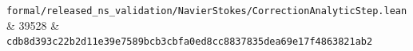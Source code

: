 \documentclass[10pt,a4paper]{article}
\begin{document}
{\begin{longtable}[]
\texttt{f\allowbreak{}o\allowbreak{}r\allowbreak{}m\allowbreak{}a\allowbreak{}l\allowbreak{}/\allowbreak{}r\allowbreak{}e\allowbreak{}l\allowbreak{}e\allowbreak{}a\allowbreak{}s\allowbreak{}e\allowbreak{}d\allowbreak{}\_\allowbreak{}n\allowbreak{}s\allowbreak{}\_\allowbreak{}v\allowbreak{}a\allowbreak{}l\allowbreak{}i\allowbreak{}d\allowbreak{}a\allowbreak{}t\allowbreak{}i\allowbreak{}o\allowbreak{}n\allowbreak{}/\allowbreak{}N\allowbreak{}a\allowbreak{}v\allowbreak{}i\allowbreak{}e\allowbreak{}r\allowbreak{}S\allowbreak{}t\allowbreak{}o\allowbreak{}k\allowbreak{}e\allowbreak{}s\allowbreak{}/\allowbreak{}C\allowbreak{}o\allowbreak{}r\allowbreak{}r\allowbreak{}e\allowbreak{}c\allowbreak{}t\allowbreak{}i\allowbreak{}o\allowbreak{}n\allowbreak{}A\allowbreak{}n\allowbreak{}a\allowbreak{}l\allowbreak{}y\allowbreak{}t\allowbreak{}i\allowbreak{}c\allowbreak{}S\allowbreak{}t\allowbreak{}e\allowbreak{}p\allowbreak{}.\allowbreak{}l\allowbreak{}e\allowbreak{}a\allowbreak{}n} & {}39528 & \texttt{c\allowbreak{}d\allowbreak{}b\allowbreak{}8\allowbreak{}d\allowbreak{}3\allowbreak{}9\allowbreak{}3\allowbreak{}c\allowbreak{}2\allowbreak{}2\allowbreak{}b\allowbreak{}2\allowbreak{}d\allowbreak{}1\allowbreak{}1\allowbreak{}e\allowbreak{}3\allowbreak{}9\allowbreak{}e\allowbreak{}7\allowbreak{}5\allowbreak{}8\allowbreak{}9\allowbreak{}b\allowbreak{}c\allowbreak{}b\allowbreak{}3\allowbreak{}c\allowbreak{}b\allowbreak{}f\allowbreak{}a\allowbreak{}0\allowbreak{}e\allowbreak{}d\allowbreak{}8\allowbreak{}c\allowbreak{}c\allowbreak{}8\allowbreak{}8\allowbreak{}3\allowbreak{}7\allowbreak{}8\allowbreak{}3\allowbreak{}5\allowbreak{}d\allowbreak{}e\allowbreak{}a\allowbreak{}6\allowbreak{}9\allowbreak{}e\allowbreak{}1\allowbreak{}7\allowbreak{}f\allowbreak{}4\allowbreak{}8\allowbreak{}6\allowbreak{}3\allowbreak{}8\allowbreak{}2\allowbreak{}1\allowbreak{}a\allowbreak{}b\allowbreak{}2} \\

\end{longtable}}
\end{document}

